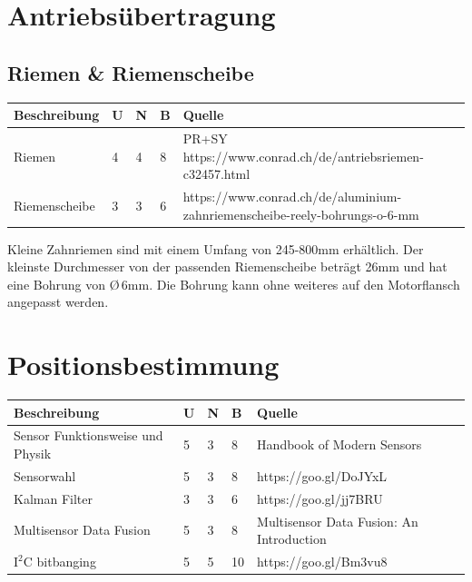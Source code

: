 \documentclass[a4paper]{report}
\begin{document}
\section{Antriebsübertragung}
\label{app:sec:Antriebuebertragung}
\subsection{Riemen \& Riemenscheibe}
\label{app:ssec:RiemenScheibe}
\begin{tabular}{|p{}|p{}|p{}|p{}|p{}|}
	\hline
	\textbf{Beschreibung} & \textbf{U} & \textbf{N} & \textbf{B} & \textbf{Quelle} \\
	\hline
	Riemen &4 &4 &8 & PR+SY
	\newline https://www.conrad.ch/de/antriebsriemen-c32457.html \\
	\hline
	Riemenscheibe &3 &3 &6 &https://www.conrad.ch/de/aluminium-zahnriemenscheibe-reely-bohrungs-o-6-mm \\
	\hline
\end{tabular}


Kleine Zahnriemen sind mit einem Umfang von 245-800mm erhältlich. Der kleinste Durchmesser von der passenden Riemenscheibe beträgt 26mm und hat eine Bohrung von \O \,6mm. Die Bohrung kann ohne weiteres auf den Motorflansch angepasst werden.

\section{Positionsbestimmung}
\label{app:sec:PosBest}
\vspace{1em}
\noindent
\begin{tabular}{|p{}|p{}|p{}|p{}|p{}|}
	\hline
	\textbf{Beschreibung} & \textbf{U} & \textbf{N} & \textbf{B} & \textbf{Quelle} \\
	\hline
	Sensor Funktionsweise und Physik & 5 & 3 & 8 & Handbook of Modern Sensors \\
	\hline
	Sensorwahl & 5 & 3 & 8 & https://goo.gl/DoJYxL \\
	\hline
	Kalman Filter & 3 & 3 & 6 & https://goo.gl/jj7BRU \\
	\hline
	Multisensor Data Fusion & 5 & 3 & 8 & Multisensor Data Fusion: An Introduction \\
	\hline
	$\text{I}^2\text{C}$ bitbanging & 5 & 5 & 10 & https://goo.gl/Bm3vu8 \\
	\hline
\end{tabular}
\end{document}
